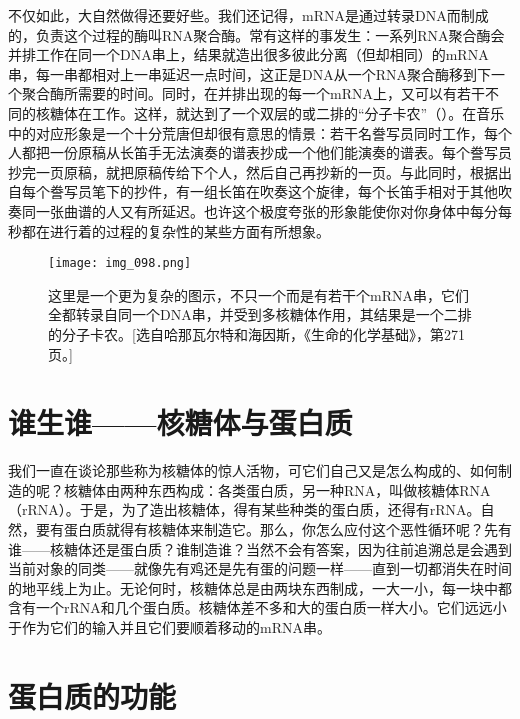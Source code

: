 \begin{figure}
\end{figure}

不仅如此，大自然做得还要好些。我们还记得，mRNA是通过转录DNA而制成的，负责这个过程的酶叫RNA聚合酶。常有这样的事发生：一系列RNA聚合酶会并排工作在同一个DNA串上，结果就造出很多彼此分离（但却相同）的mRNA串，每一串都相对上一串延迟一点时间，这正是DNA从一个RNA聚合酶移到下一个聚合酶所需要的时间。同时，在并排出现的每一个mRNA上，又可以有若干不同的核糖体在工作。这样，就达到了一个双层的或二排的“分子卡农”（）。在音乐中的对应形象是一个十分荒唐但却很有意思的情景：若干名誊写员同时工作，每个人都把一份原稿从长笛手无法演奏的谱表抄成一个他们能演奏的谱表。每个誊写员抄完一页原稿，就把原稿传给下个人，然后自己再抄新的一页。与此同时，根据出自每个誊写员笔下的抄件，有一组长笛在吹奏这个旋律，每个长笛手相对于其他吹奏同一张曲谱的人又有所延迟。也许这个极度夸张的形象能使你对你身体中每分每秒都在进行着的过程的复杂性的某些方面有所想象。

\begin{figure}
\texttt{[image: img\_098.png]}
\caption[二排的分子卡农。]
  {这里是一个更为复杂的图示，不只一个而是有若干个mRNA串，它们全都转录自同一个DNA串，并受到多核糖体作用，其结果是一个二排的分子卡农。[选自哈那瓦尔特和海因斯，《生命的化学基础》，第271页。]}
\end{figure}

\section{谁生谁——核糖体与蛋白质}

我们一直在谈论那些称为核糖体的惊人活物，可它们自己又是怎么构成的、如何制造的呢？核糖体由两种东西构成：各类蛋白质，另一种RNA，叫做核糖体RNA（rRNA）。于是，为了造出核糖体，得有某些种类的蛋白质，还得有rRNA。自然，要有蛋白质就得有核糖体来制造它。那么，你怎么应付这个恶性循环呢？先有谁——核糖体还是蛋白质？谁制造谁？当然不会有答案，因为往前追溯总是会遇到当前对象的同类——就像先有鸡还是先有蛋的问题一样——直到一切都消失在时间的地平线上为止。无论何时，核糖体总是由两块东西制成，一大一小，每一块中都含有一个rRNA和几个蛋白质。核糖体差不多和大的蛋白质一样大小。它们远远小于作为它们的输入并且它们要顺着移动的mRNA串。

\section{蛋白质的功能}


